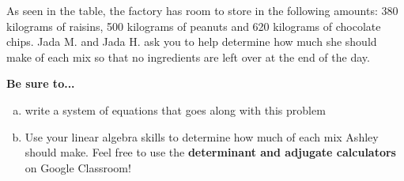 \documentclass{exam}
\begin{document}
\begin{questions}
As seen in the table, the factory has room to store in the following amounts: 380 kilograms of raisins, 500 kilograms of peanuts and 620 kilograms of chocolate chips.    Jada M. and Jada H. ask you  to help determine how much she should make of each mix so that no ingredients are left over at the end of the day.

\textbf{Be sure to...}
\begin{enumerate}[a.]
\item write a system of equations that goes along with this problem
\item Use your linear algebra skills to determine how much of each mix Ashley should make. Feel free to use the  \textbf{determinant and adjugate calculators} on Google Classroom!
\end{enumerate}

\end{questions}
\end{document}
